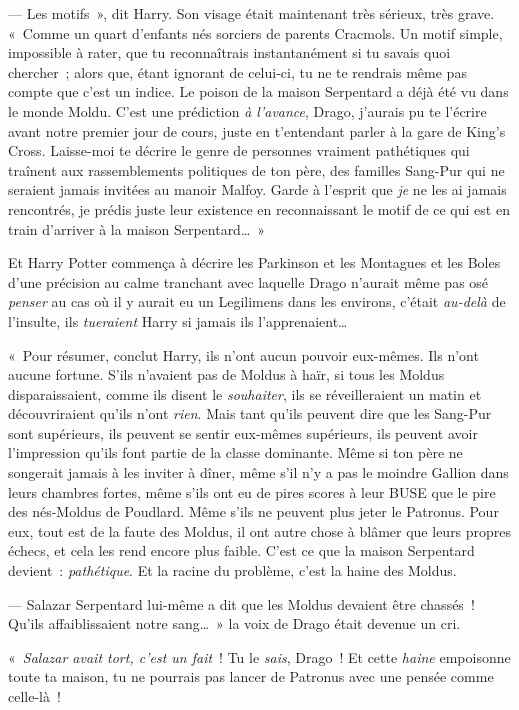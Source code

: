 --- Les motifs~», dit Harry.
Son visage était maintenant très sérieux, très grave.
«~Comme un quart d'enfants nés sorciers de parents Cracmols.
Un motif simple, impossible à rater, que tu reconnaîtrais instantanément si tu savais quoi chercher~; alors que, étant ignorant de celui-ci, tu ne te rendrais même pas compte que c'est un indice.
Le poison de la maison Serpentard a déjà été vu dans le monde Moldu.
C'est une prédiction \emph{à l'avance}, Drago, j'aurais pu te l'écrire avant notre premier jour de cours, juste en t'entendant parler à la gare de King's Cross.
Laisse-moi te décrire le genre de personnes vraiment pathétiques qui traînent aux rassemblements politiques de ton père, des familles Sang-Pur qui ne seraient jamais invitées au manoir Malfoy.
Garde à l'esprit que \emph{je} ne les ai jamais rencontrés, je prédis juste leur existence en reconnaissant le motif de ce qui est en train d'arriver à la maison Serpentard…~»

Et Harry Potter commença à décrire les Parkinson et les Montagues et les Boles d'une précision au calme tranchant avec laquelle Drago n'aurait même pas osé \emph{penser} au cas où il y aurait eu un Legilimens dans les environs, c'était \emph{au-delà} de l'insulte, ils \emph{tueraient} Harry si jamais ils l'apprenaient…

«~Pour résumer, conclut Harry, ils n'ont aucun pouvoir eux-mêmes.
Ils n'ont aucune fortune.
S'ils n'avaient pas de Moldus à haïr, si tous les Moldus disparaissaient, comme ils disent le \emph{souhaiter}, ils se réveilleraient un matin et découvriraient qu'ils n'ont \emph{rien}.
Mais tant qu'ils peuvent dire que les Sang-Pur sont supérieurs, ils peuvent se sentir eux-mêmes supérieurs, ils peuvent avoir l'impression qu'ils font partie de la classe dominante.
Même si ton père ne songerait jamais à les inviter à dîner, même s'il n'y a pas le moindre Gallion dans leurs chambres fortes, même s'ils ont eu de pires scores à leur BUSE que le pire des nés-Moldus de Poudlard.
Même s'ils ne peuvent plus jeter le Patronus.
Pour eux, tout est de la faute des Moldus, il ont autre chose à blâmer que leurs propres échecs, et cela les rend encore plus faible.
C'est ce que la maison Serpentard devient~: \emph{pathétique}.
Et la racine du problème, c'est la haine des Moldus.

--- Salazar Serpentard lui-même a dit que les Moldus devaient être chassés~!
Qu'ils affaiblissaient notre sang…~»
la voix de Drago était devenue un cri.

«~\emph{Salazar avait tort, c'est un fait}~!
Tu le \emph{sais}, Drago~!
Et cette \emph{haine} empoisonne toute ta maison, tu ne pourrais pas lancer de Patronus avec une pensée comme celle-là~!

